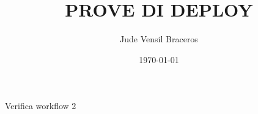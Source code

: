 \documentclass{article}
\title{PROVE DI DEPLOY}
\author{Jude Vensil Braceros}
\date{\today}
\begin{document}
\maketitle

Verifica workflow 2
\end{document}

